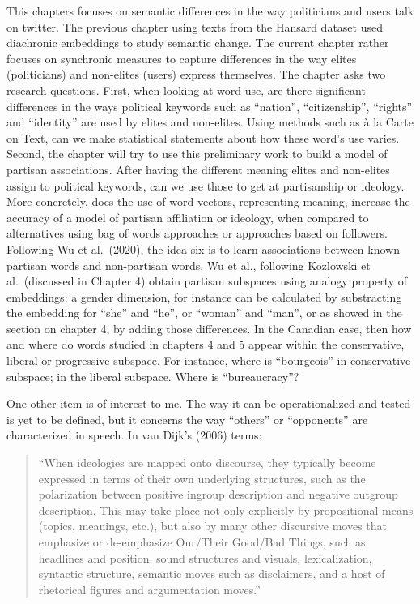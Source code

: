 \documentclass[
  openany]{book}
\begin{document}
This chapters focuses on semantic differences in the way politicians and users talk on twitter. The previous chapter using texts from the Hansard dataset used diachronic embeddings to study semantic change. The current chapter rather focuses on synchronic measures to capture differences in the way elites (politicians) and non-elites (users) express themselves.
The chapter asks two research questions. First, when looking at word-use, are there significant differences in the ways political keywords such as ``nation'', ``citizenship'', ``rights'' and ``identity'' are used by elites and non-elites. Using methods such as à la Carte on Text, can we make statistical statements about how these word's use varies. Second, the chapter will try to use this preliminary work to build a model of partisan associations. After having the different meaning elites and non-elites assign to political keywords, can we use those to get at partisanship or ideology. More concretely, does the use of word vectors, representing meaning, increase the accuracy of a model of partisan affiliation or ideology, when compared to alternatives using bag of words approaches or approaches based on followers. Following Wu et al.~(2020), the idea six is to learn associations between known partisan words and non-partisan words. Wu et al., following Kozlowski et al.~(discussed in Chapter 4) obtain partisan subspaces using analogy property of embeddings: a gender dimension, for instance can be calculated by substracting the embedding for ``she'' and ``he'', or ``woman'' and ``man'', or as showed in the section on chapter 4, by adding those differences. In the Canadian case, then how and where do words studied in chapters 4 and 5 appear within the conservative, liberal or progressive subspace. For instance, where is ``bourgeois'' in conservative subspace; in the liberal subspace. Where is ``bureaucracy''?

One other item is of interest to me. The way it can be operationalized and tested is yet to be defined, but it concerns the way ``others'' or ``opponents'' are characterized in speech. In van Dijk's (2006) terms:

\begin{quote}
``When ideologies are mapped onto discourse, they typically become expressed in terms of their own underlying structures, such as the polarization between positive ingroup description and negative outgroup description. This may take place not only explicitly by propositional means (topics, meanings, etc.), but also by many other discursive moves that emphasize or de-emphasize Our/Their Good/Bad Things, such as headlines and position, sound structures and visuals, lexicalization, syntactic structure, semantic moves such as disclaimers, and a host of rhetorical figures and argumentation moves.''
\end{quote}
\end{document}
